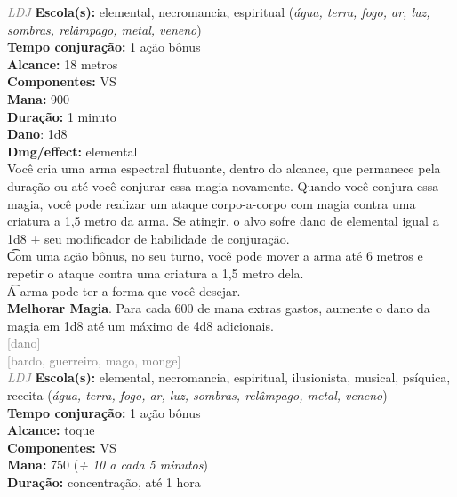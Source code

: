 \documentclass{RPG_Adventure}[2021/10/20]
\begin{document}
{\tiny \textcolor{gray}{\textit{LDJ}}}
{\small \t \textbf{Escola(s):} elemental, necromancia, espiritual (\textit{água, terra, fogo, ar, luz, sombras, relâmpago, metal, veneno})\\\t \textbf{Tempo conjuração:} 1 ação bônus\\\t \textbf{Alcance:} 18 metros\\\t \textbf{Componentes:} VS\\\t \textbf{Mana:} 900\\\t \textbf{Duração:} 1 minuto\\\t \textbf{Dano}: 1d8\\\t \textbf{Dmg/effect:} elemental\\}
{\normalsize Você cria uma arma espectral flutuante, dentro do alcance, que permanece pela duração ou até você conjurar essa magia novamente. Quando você conjura essa magia, você pode realizar um ataque corpo-a-corpo com magia contra uma criatura a 1,5 metro da arma. Se atingir, o alvo sofre dano de elemental igual a 1d8 + seu modificador de habilidade de conjuração.\\\t Com uma ação bônus, no seu turno, você pode mover a arma até 6 metros e repetir o ataque contra uma criatura a 1,5 metro dela.\\\t A arma pode ter a forma que você desejar.\\\t \textbf{Melhorar Magia}. Para cada 600 de mana extras gastos, aumente o dano da magia em 1d8 até um máximo de 4d8 adicionais.\\}
{\scriptsize \textcolor{gray}{[dano]\\}}
{\scriptsize \textcolor{gray}{[bardo, guerreiro, mago, monge]\\}}
{\tiny \textcolor{gray}{\textit{LDJ}}}
{\small \t \textbf{Escola(s):} elemental, necromancia, espiritual, ilusionista, musical, psíquica, receita (\textit{água, terra, fogo, ar, luz, sombras, relâmpago, metal, veneno})\\\t \textbf{Tempo conjuração:} 1 ação bônus\\\t \textbf{Alcance:} toque\\\t \textbf{Componentes:} VS\\\t \textbf{Mana:} 750 (\textit{+ 10 a cada 5 minutos})\\\t \textbf{Duração:} concentração, até 1 hora\\}
\end{document}
